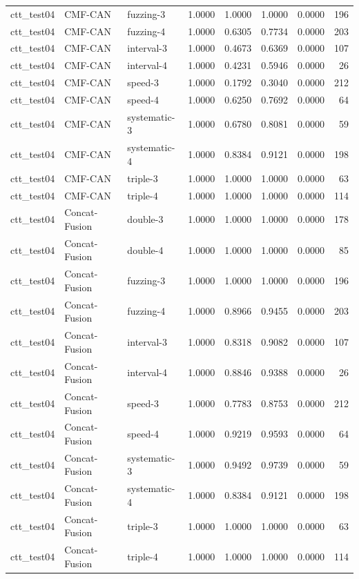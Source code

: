 \begin{tabular}{lllrrrrr}
ctt\_test04 & CMF-CAN & fuzzing-3 & 1.0000 & 1.0000 & 1.0000 & 0.0000 & 196 \\
ctt\_test04 & CMF-CAN & fuzzing-4 & 1.0000 & 0.6305 & 0.7734 & 0.0000 & 203 \\
ctt\_test04 & CMF-CAN & interval-3 & 1.0000 & 0.4673 & 0.6369 & 0.0000 & 107 \\
ctt\_test04 & CMF-CAN & interval-4 & 1.0000 & 0.4231 & 0.5946 & 0.0000 & 26 \\
ctt\_test04 & CMF-CAN & speed-3 & 1.0000 & 0.1792 & 0.3040 & 0.0000 & 212 \\
ctt\_test04 & CMF-CAN & speed-4 & 1.0000 & 0.6250 & 0.7692 & 0.0000 & 64 \\
ctt\_test04 & CMF-CAN & systematic-3 & 1.0000 & 0.6780 & 0.8081 & 0.0000 & 59 \\
ctt\_test04 & CMF-CAN & systematic-4 & 1.0000 & 0.8384 & 0.9121 & 0.0000 & 198 \\
ctt\_test04 & CMF-CAN & triple-3 & 1.0000 & 1.0000 & 1.0000 & 0.0000 & 63 \\
ctt\_test04 & CMF-CAN & triple-4 & 1.0000 & 1.0000 & 1.0000 & 0.0000 & 114 \\
ctt\_test04 & Concat-Fusion & double-3 & 1.0000 & 1.0000 & 1.0000 & 0.0000 & 178 \\
ctt\_test04 & Concat-Fusion & double-4 & 1.0000 & 1.0000 & 1.0000 & 0.0000 & 85 \\
ctt\_test04 & Concat-Fusion & fuzzing-3 & 1.0000 & 1.0000 & 1.0000 & 0.0000 & 196 \\
ctt\_test04 & Concat-Fusion & fuzzing-4 & 1.0000 & 0.8966 & 0.9455 & 0.0000 & 203 \\
ctt\_test04 & Concat-Fusion & interval-3 & 1.0000 & 0.8318 & 0.9082 & 0.0000 & 107 \\
ctt\_test04 & Concat-Fusion & interval-4 & 1.0000 & 0.8846 & 0.9388 & 0.0000 & 26 \\
ctt\_test04 & Concat-Fusion & speed-3 & 1.0000 & 0.7783 & 0.8753 & 0.0000 & 212 \\
ctt\_test04 & Concat-Fusion & speed-4 & 1.0000 & 0.9219 & 0.9593 & 0.0000 & 64 \\
ctt\_test04 & Concat-Fusion & systematic-3 & 1.0000 & 0.9492 & 0.9739 & 0.0000 & 59 \\
ctt\_test04 & Concat-Fusion & systematic-4 & 1.0000 & 0.8384 & 0.9121 & 0.0000 & 198 \\
ctt\_test04 & Concat-Fusion & triple-3 & 1.0000 & 1.0000 & 1.0000 & 0.0000 & 63 \\
ctt\_test04 & Concat-Fusion & triple-4 & 1.0000 & 1.0000 & 1.0000 & 0.0000 & 114 \\

\end{tabular}
